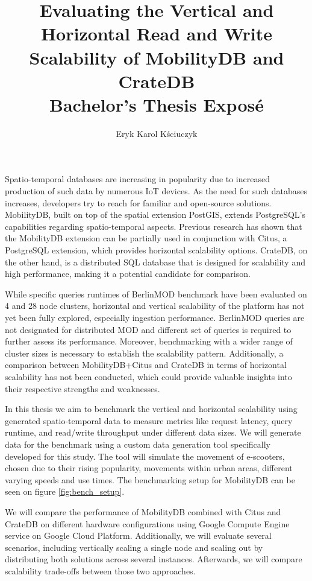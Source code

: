 \documentclass{article}
\title{
	Evaluating the Vertical and Horizontal Read and Write Scalability of 
	MobilityDB and CrateDB
	\\[1ex] \large Bachelor's Thesis Exposé}
\author{Eryk Karol Kściuczyk}
\date{} %
\begin{document}
\maketitle

Spatio-temporal databases are increasing in popularity due to increased
production of such data by numerous IoT devices.
As the need for such databases increases, developers try to reach for 
familiar and open-source solutions.
MobilityDB, built on top of the spatial extension PostGIS, extends PostgreSQL's 
capabilities regarding spatio-temporal aspects.
Previous research has shown that the MobilityDB extension can be partially used
in conjunction with Citus, a PostgreSQL extension, which provides horizontal
scalability options.
CrateDB, on the other hand, is a distributed SQL database that is designed for
scalability and high performance, making it a potential candidate for comparison.

While specific queries runtimes of BerlinMOD benchmark have been 
evaluated on 4 and 28 node clusters,
horizontal and vertical scalability of the platform has not yet been fully
explored, especially ingestion performance.
BerlinMOD queries are not designated for distributed MOD and different set of
queries is required to further assess its performance.
Moreover, benchmarking with a wider range of cluster sizes is necessary to 
establish the scalability pattern.
Additionally, a comparison between MobilityDB+Citus and CrateDB in terms of
horizontal scalability has not been conducted, which could provide valuable
insights into their respective strengths and weaknesses.

In this thesis we aim to benchmark the vertical and horizontal scalability
using generated spatio-temporal data to measure metrics like request 
latency, query runtime, and read/write throughput under different data sizes.
We will generate data for the benchmark using a custom data generation tool
specifically developed for this study.
The tool will simulate the movement of e-scooters, chosen due to their
rising popularity, movements within urban areas, different 
varying speeds and use times. The benchmarking setup for MobilityDB can be seen 
on figure \ref{fig:bench_setup}.

We will compare the performance of MobilityDB combined with Citus and CrateDB on different
hardware configurations using Google Compute Engine service on Google Cloud
Platform.
Additionally, we will evaluate several scenarios, including vertically scaling 
a single node and scaling out by distributing both solutions across several
instances. 
Afterwards, we will compare scalability trade-offs between those two
approaches.
\end{document}
